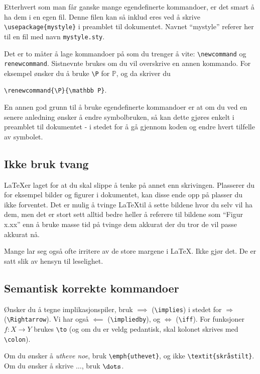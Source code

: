 \documentclass[a4paper, norsk]{article}  %
\renewcommand{\P}{\mathbb{P}}
\begin{document}
Etterhvert som man får ganske mange egendefinerte kommandoer, er det smart å ha dem i en egen fil. Denne filen kan så inklud	eres ved å skrive \verb|\usepackage{mystyle}| i preamblet til dokumentet. Navnet ``mystyle'' referer her til en fil med navn \verb|mystyle.sty|.

Det er to måter å lage kommandoer på som du trenger å vite: \verb|\newcommand| og \verb|renewcommand|. Sistnevnte brukes om du vil overskrive en annen kommando. For eksempel ønsker du å bruke \verb|\P| for $\P$, og da skriver du 
\begin{center}
\texttt{\textbackslash renewcommand\{\textbackslash P\}\{\textbackslash mathbb P\}}.
\end{center}

En annen god grunn til å bruke egendefinerte kommandoer er at om du ved en senere anledning ønsker å endre symbolbruken, så kan dette gjøres enkelt i preamblet til dokumentet - i stedet for å gå gjennom koden og endre hvert tilfelle av symbolet.

\subsection{Ikke bruk tvang}

\LaTeX er laget for at du skal slippe å tenke på annet enn skrivingen. Plasserer du for eksempel bilder og figurer i dokumentet, kan disse ende opp på plasser du ikke forventet. Det er mulig å tvinge \LaTeX til å sette bildene hvor du selv vil ha dem, men det er stort sett alltid bedre heller å referere til bildene som ``Figur x.xx'' enn å bruke masse tid på tvinge dem akkurat der du tror de vil passe akkurat nå.

Mange lar seg også ofte irritere av de store margene i \LaTeX. Ikke gjør det. De er satt slik av hensyn til leselighet.

\subsection{Semantisk korrekte kommandoer}

Ønsker du å tegne implikasjonspiler, bruk $\implies$ (\verb|\implies|) i stedet for $\Rightarrow$ (\verb|\Rightarrow|). Vi har også $\impliedby$ (\verb|\impliedby|), og $\iff$ (\verb|\iff|). For funksjoner $f\colon X \to Y$ brukes \verb|\to| (og om du er veldg pedantisk, skal kolonet skrives med \verb|\colon|).

Om du ønsker å \emph{utheve noe}, bruk \verb|\emph{uthevet}|, og ikke \verb|\textit{skråstilt}|. Om du ønsker å skrive $\dots$, bruk $\verb|\dots|$.
\end{document}
